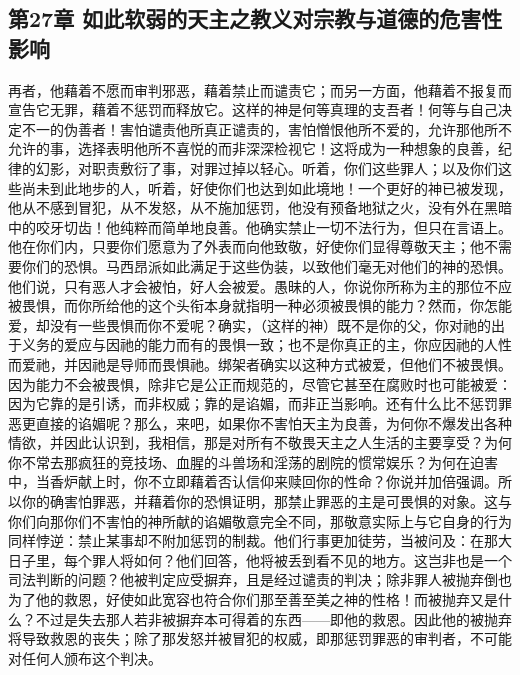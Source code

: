 \subsection{第27章 如此软弱的天主之教义对宗教与道德的危害性影响}

再者，他藉着不愿而审判邪恶，藉着禁止而谴责它；而另一方面，他藉着不报复而宣告它无罪，藉着不惩罚而释放它。这样的神是何等真理的支吾者！何等与自己决定不一的伪善者！害怕谴责他所真正谴责的，害怕憎恨他所不爱的，允许那他所不允许的事，选择表明他所不喜悦的而非深深检视它！这将成为一种想象的良善，纪律的幻影，对职责敷衍了事，对罪过掉以轻心。听着，你们这些罪人；以及你们这些尚未到此地步的人，听着，好使你们也达到如此境地！一个更好的神已被发现，他从不感到冒犯，从不发怒，从不施加惩罚，他没有预备地狱之火，没有外在黑暗中的咬牙切齿！他纯粹而简单地良善。他确实禁止一切不法行为，但只在言语上。他在你们内，只要你们愿意为了外表而向他致敬，好使你们显得尊敬天主；他不需要你们的恐惧。马西昂派如此满足于这些伪装，以致他们毫无对他们的神的恐惧。他们说，只有恶人才会被怕，好人会被爱。愚昧的人，你说你所称为主的那位不应被畏惧，而你所给他的这个头衔本身就指明一种必须被畏惧的能力？然而，你怎能爱，却没有一些畏惧而你不爱呢？确实，（这样的神）既不是你的父，你对祂的出于义务的爱应与因祂的能力而有的畏惧一致；也不是你真正的主，你应因祂的人性而爱祂，并因祂是导师而畏惧祂。绑架者确实以这种方式被爱，但他们不被畏惧。因为能力不会被畏惧，除非它是公正而规范的，尽管它甚至在腐败时也可能被爱：因为它靠的是引诱，而非权威；靠的是谄媚，而非正当影响。还有什么比不惩罚罪恶更直接的谄媚呢？那么，来吧，如果你不害怕天主为良善，为何你不爆发出各种情欲，并因此认识到，我相信，那是对所有不敬畏天主之人生活的主要享受？为何你不常去那疯狂的竞技场、血腥的斗兽场和淫荡的剧院的惯常娱乐？为何在迫害中，当香炉献上时，你不立即藉着否认信仰来赎回你的性命？你说并加倍强调。所以你的确害怕罪恶，并藉着你的恐惧证明，那禁止罪恶的主是可畏惧的对象。这与你们向那你们不害怕的神所献的谄媚敬意完全不同，那敬意实际上与它自身的行为同样悖逆：禁止某事却不附加惩罚的制裁。他们行事更加徒劳，当被问及：在那大日子里，每个罪人将如何？他们回答，他将被丢到看不见的地方。这岂非也是一个司法判断的问题？他被判定应受摒弃，且是经过谴责的判决；除非罪人被抛弃倒也为了他的救恩，好使如此宽容也符合你们那至善至美之神的性格！而被抛弃又是什么？不过是失去那人若非被摒弃本可得着的东西——即他的救恩。因此他的被抛弃将导致救恩的丧失；除了那发怒并被冒犯的权威，即那惩罚罪恶的审判者，不可能对任何人颁布这个判决。\par


